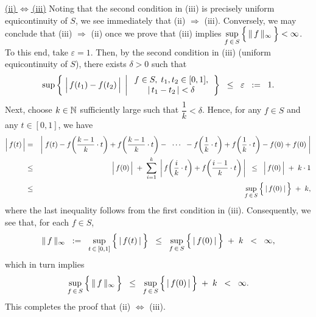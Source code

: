 \vskip 0.5cm
\noindent
\underline{(ii)\,$\Longleftrightarrow$\,(iii)}
\vskip 0.1cm
\noindent
Noting that the second condition in (iii) is precisely uniform equicontinuity of $S$,
we see immediately that (ii) $\Longrightarrow$ (iii).
Conversely, we may conclude that (iii) $\Longrightarrow$ (ii) once we prove that
(iii) implies
$\underset{f\,\in\,S}{\sup}\left\{\,\Vert\,\overset{{\color{white}.}}{f}\,\Vert_{\infty}\,\right\} < \infty$.
To this end, take $\varepsilon = 1$.
Then, by the second condition in (iii) (uniform equicontinuity of $S$),
there exists $\delta > 0$ such that
\begin{equation*}
\sup\left\{\;
\left\vert\,\overset{{\color{white}.}}{f}(t_{1}) - f(t_{2})\,\right\vert
\;\left\vert\;
\begin{array}{c} f \in S, \; t_{1},t_{2} \in [0,1], \\ \vert\,t_{1} - t_{2}\,\vert < \delta \end{array}
\right.
\right\}
\;\;\leq\;\; \varepsilon \;\; := \;\; 1.
\end{equation*}
Next, choose $k \in \mathbb{N}$ sufficiently large such that $\dfrac{1}{k} < \delta$.
Hence, for any $f \in S$ and any $t \in [0,1]$, we have
\begin{eqnarray*}
\left\vert\,\overset{{\color{white}.}}{f}(t)\,\right\vert
&=&
	\left\vert\;
	f(t)
	- f\!\left(\frac{k-1}{k}\cdot t\right) + f\!\left(\frac{k-1}{k}\cdot t\right)
	- \;\;\cdots\;\;
	- f\!\left(\frac{1}{k}\cdot t\right) + f\!\left(\frac{1}{k}\cdot t\right)
	- f\!\left(0\right) + f\!\left(0\right)
	\;\right\vert
\\
&\leq&
	\left\vert\,\overset{{\color{white}.}}{f}(0)\,\right\vert
	\;+\; \sum_{i=1}^{k}\;\left\vert\, f\!\left(\frac{i}{k}\cdot t\right) + f\!\left(\frac{i-1}{k}\cdot t\right) \,\right\vert
	\;\;\leq\;\; \left\vert\,\overset{{\color{white}.}}{f}(0)\,\right\vert \;+\; k\cdot 1
\\
&\leq&
	\underset{f\,\in\,S}{\sup}\left\{\,\vert\,\overset{{\color{white}.}}{f}(0)\,\vert\,\right\} \;+\; k,
\end{eqnarray*}
where the last inequality follows from the first condition in (iii).
Consequently, we see that, for each $f \in S$,
\begin{equation*}
\Vert\,\overset{{\color{white}.}}{f}\,\Vert_{\infty}
\;\; := \;\;
\underset{t\,\in\,[0,1]}{\sup}\left\{\,\vert\,\overset{{\color{white}.}}{f}(t)\,\vert\,\right\}
\;\;\leq\;\;
\underset{f\,\in\,S}{\sup}\left\{\,\vert\,\overset{{\color{white}.}}{f}(0)\,\vert\,\right\} \;+\; k
\;\;<\;\; \infty,
\end{equation*}
which in turn implies
\begin{equation*}
\underset{f\,\in\,S}{\sup}\left\{\,\Vert\,\overset{{\color{white}.}}{f}\,\Vert_{\infty}\,\right\}
\;\;\leq\;\;
\underset{f\,\in\,S}{\sup}\left\{\,\vert\,\overset{{\color{white}.}}{f}(0)\,\vert\,\right\} \;+\; k
\;\;<\;\; \infty.
\end{equation*}
This completes the proof that (ii) $\Longleftrightarrow$ (iii).

